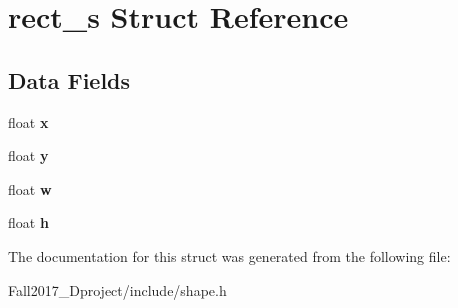 \hypertarget{structrect__s}{}\section{rect\+\_\+s Struct Reference}
\label{structrect__s}
\subsection*{Data Fields}
\begin{DoxyCompactItemize}
\item 
\mbox{\label{structrect__s_ad0da36b2558901e21e7a30f6c227a45e}} 
float {\bfseries x}
\item 
\mbox{\label{structrect__s_aa4f0d3eebc3c443f9be81bf48561a217}} 
float {\bfseries y}
\item 
\mbox{\label{structrect__s_a56eca241e2896b9f57a79589e76fd24b}} 
float {\bfseries w}
\item 
\mbox{\label{structrect__s_a85f2f1bd58b3b44ffdf3881823393959}} 
float {\bfseries h}
\end{DoxyCompactItemize}


The documentation for this struct was generated from the following file\+:\begin{DoxyCompactItemize}
\item 
Fall2017\+\_\+Dproject/include/shape.\+h\end{DoxyCompactItemize}
